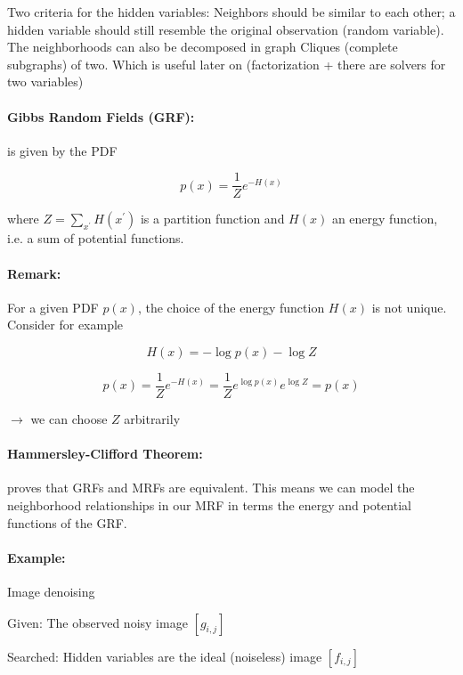 Two criteria for the hidden variables: Neighbors should be similar to each other; a hidden variable should still resemble the original observation (random variable).
The neighborhoods can also be decomposed in graph Cliques (complete subgraphs) of two. Which is useful later on (factorization + there are solvers for two variables)

\paragraph{Gibbs Random Fields (GRF):} is given by the PDF

\begin{equation*}
	p(x) = \frac{1}{Z} e^{-H(x)}
\end{equation*}

where $Z = \sum_{x^\prime} H(x^{\prime})$ is a partition function and $H(x)$ an energy function, i.e. a sum of potential functions.

\paragraph{Remark:}
For a given PDF $p(x)$, the choice of the energy function $H(x)$ is not unique. Consider for example

\begin{equation*}
	H(x) = - \log p(x) - \log Z
\end{equation*}

\begin{equation*}
	p(x) = \frac{1}{Z} e^{-H(x)} = \frac{1}{Z} e^{\log p(x)} e^{\log Z}  = p(x)
\end{equation*}

$\rightarrow$ we can choose $Z$ arbitrarily\\

\paragraph{Hammersley-Clifford Theorem:} proves that GRFs and MRFs are equivalent. This means we can model the neighborhood relationships in our MRF in terms the energy and potential functions of the GRF.

\paragraph{Example:} Image denoising

Given: The observed noisy image $[g_{i,j}]$

Searched: Hidden variables are the ideal (noiseless) image $[f_{i,j}]$\\


